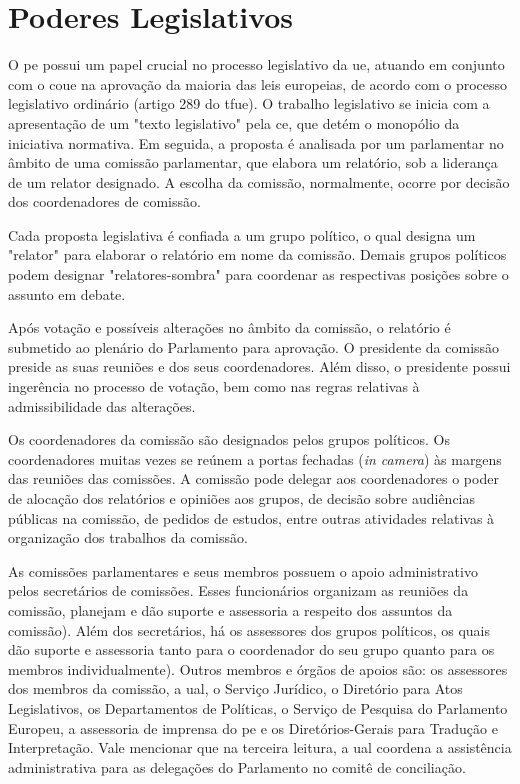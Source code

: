 \section{Poderes Legislativos}
\label{section:podereslegislativos}

O \acrshort{pe} possui um papel crucial no processo legislativo da \acrshort{ue}, atuando em conjunto com o \acrshort{coue} na aprovação da maioria das leis europeias, de acordo com o processo legislativo ordinário (artigo 289 do \acrshort{tfue}). O trabalho legislativo se inicia com a apresentação de um "texto legislativo" pela \acrshort{ce}, que detém o monopólio da iniciativa normativa. Em seguida, a proposta é analisada por um parlamentar no âmbito de uma comissão parlamentar, que elabora um relatório, sob a liderança de um relator designado. A escolha da comissão, normalmente, ocorre por decisão dos coordenadores de comissão. 

Cada proposta legislativa é confiada a um grupo político, o qual designa um "relator" para elaborar o relatório em nome da comissão. Demais grupos políticos podem designar "relatores-sombra" para coordenar as respectivas posições sobre o assunto em debate.

Após votação e possíveis alterações no âmbito da comissão, o relatório é submetido ao plenário do Parlamento para aprovação. O presidente da comissão preside as suas reuniões e dos seus coordenadores. Além disso, o presidente possui ingerência no processo de votação, bem como nas regras relativas à admissibilidade das alterações.

Os coordenadores da comissão são designados pelos grupos políticos. Os coordenadores muitas vezes se reúnem a portas fechadas (\textit{in camera}) às margens das reuniões das comissões. A comissão pode delegar aos coordenadores o poder de alocação dos relatórios e opiniões aos grupos, de decisão sobre audiências públicas na comissão, de pedidos de estudos, entre outras atividades relativas à organização dos trabalhos da comissão.

As comissões parlamentares e seus membros possuem o apoio administrativo pelos secretários de comissões. Esses funcionários organizam as reuniões da comissão, planejam e dão suporte e assessoria a respeito dos assuntos da comissão). Além dos secretários, há os assessores dos grupos políticos, os quais dão suporte e assessoria tanto para o coordenador do seu grupo quanto para os membros individualmente). Outros membros e órgãos de apoios são: os assessores dos membros da comissão, a \acrfull{ual}, o Serviço Jurídico, o Diretório para Atos Legislativos, os Departamentos de Políticas, o Serviço de Pesquisa do Parlamento Europeu, a assessoria de imprensa do \acrshort{pe} e os Diretórios-Gerais para Tradução e Interpretação. Vale mencionar que na terceira leitura, a \acrshort{ual} coordena a assistência administrativa para as delegações do Parlamento no comitê de conciliação.

